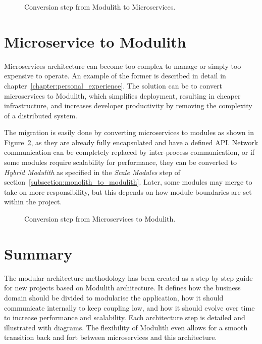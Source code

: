 \begin{figure}
    \centering
    
    \caption{Conversion step from Modulith to Microservices.\label{fig:modulith_to_microservices_steps}}
\end{figure}


\section{Microservice to Modulith}
\label{subsection:microservices_to_modulith}
Microservices architecture can become too complex to manage or simply too expensive to operate. An example of the former is described in detail in chapter~\ref{chapter:personal_experience}. The solution can be to convert microservices to Modulith, which simplifies deployment, resulting in cheaper infrastructure, and increases developer productivity by removing the complexity of a distributed system.

The migration is easily done by converting microservices to modules as shown in Figure~\ref{fig:microservices_to_modulith_steps}, as they are already fully encapsulated and have a defined API. Network communication can be completely replaced by inter-process communication, or if some modules require scalability for performance, they can be converted to \textit{Hybrid Modulith} as specified in the \textit{Scale Modules} step of section~\ref{subsection:monolith_to_modulith}. Later, some modules may merge to take on more responsibility, but this depends on how module boundaries are set within the project.

\begin{figure}
    \centering
    
    \caption{Conversion step from Microservices to Modulith.\label{fig:microservices_to_modulith_steps}}
\end{figure}


\section{Summary}
The modular architecture methodology has been created as a step-by-step guide for new projects based on Modulith architecture. It defines how the business domain should be divided to modularise the application, how it should communicate internally to keep coupling low, and how it should evolve over time to increase performance and scalability. Each architecture step is detailed and illustrated with diagrams. The flexibility of Modulith even allows for a smooth transition back and fort between microservices and this architecture.

